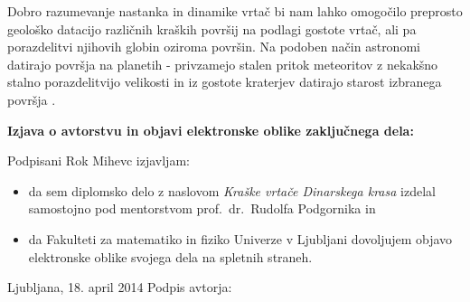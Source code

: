 \documentclass[a4paper, twoside, 12pt]{book}
\begin{document}
Dobro razumevanje nastanka in dinamike vrtač bi nam lahko omogočilo preprosto geološko datacijo različnih kraških površij na podlagi gostote vrtač, ali pa porazdelitvi njihovih globin oziroma površin. Na podoben način astronomi datirajo površja na planetih - privzamejo stalen pritok meteoritov z nekakšno stalno porazdelitvijo velikosti in iz gostote kraterjev datirajo starost izbranega površja \cite{trey2011size}.

    \newpage \thispagestyle{empty}


    \nocite{*}
    \newpage
    {}
    

    \newpage \thispagestyle{empty}



    \vspace*{1cm}
    \begin{center} {\Large \textbf{\sc Izjava o avtorstvu in objavi elektronske oblike zaključnega dela: }} \end{center}

      \vspace{1cm} \noindent Podpisani Rok Mihevc izjavljam:
      \noindent 

      \begin{itemize}
        \item 
          da sem diplomsko delo z naslovom \emph{Kraške vrtače Dinarskega krasa} izdelal samostojno pod mentorstvom prof.\ dr.\ \mbox{Rudolfa} \mbox{Podgornika} in
        \item
          da Fakulteti za matematiko in fiziko Univerze v Ljubljani dovoljujem objavo elektronske 
          oblike svojega dela na spletnih straneh.
      \end{itemize}

      \vspace{1cm} \noindent Ljubljana, 18. april 2014 \hfill Podpis avtorja:


      
\end{document}
